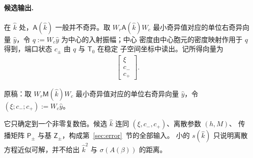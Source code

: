 \paragraph{候选输出.}
在 $\widehat k$ 处，$\mathsf A(\widehat k)$ 一般并不奇异。取 $W_r\mathsf A(\widehat k)W_c$
最小奇异值对应的单位右奇异向量 $\widehat y$，令 $q:=W_c\widehat y$ 为中心的入射振幅；中心
密度由中心胞元的密度映射作用于 $q$ 得到，端口状态 $c_\pm$ 由 $q$ 与 $\mathsf T_0$ 在稳定
子空间坐标中读出。记所得向量为
\begin{align}
  \begin{bmatrix}\xi\\ c_-\\ c_+\end{bmatrix}.
  \label{eq:candidate-vector}
\end{align}
\begin{workonly}
原稿：取 $W_r\mathsf M(\widehat k)W_c$ 最小奇异值对应的单位右奇异向量 $\widehat y$，令
$(\xi;c_-;c_+):=W_c\widehat y$。
\end{workonly}
它只确定到一个非零复数倍。候选 $\widehat k$ 连同 $(\xi,c_-,c_+)$、离散参数 $(h,M)$、
传播矩阵 $\mathsf P_\pm$ 与基 $\mathsf Z_\pm$，构成第~\ref{sec:error}~节的全部输入。
小的 $s(\widehat k)$ 只说明离散方程近似可解，并不给出 $\widehat k^2$ 与
$\sigma(A(\beta))$ 的距离。

